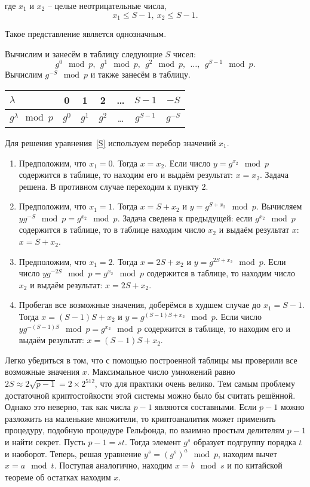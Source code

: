 где $x_{1}$ и $x_{2}$ -- целые неотрицательные числа,
    \[ x_{1} \leq S-1, ~ x_{2} \leq S-1. \]

Такое представление является однозначным.

Вычислим и занесём в таблицу следующие $S$ чисел:
    \[ g^{0} \mod p, ~~ g^{1} \mod p, ~~ g^{2} \mod p, ~~ \dots, ~~ g^{S-1} \mod p. \]
Вычислим $g^{-S} \mod p$ и также занесём в таблицу.

\begin{center} \begin{tabular}{|l|c|c|c|c|c|c|}
    \hline
    $\lambda $ & 0 & 1 & 2 & \dots & $S-1$ & $-S$ \\
    \hline
    $g^{\lambda} \mod p$ & $g^{0}$ & $g^{1}$ & $g^{2}$ & \dots & $g^{S-1}$ & $g^{-S}$ \\
    \hline
\end{tabular} \end{center}

Для решения уравнения~\ref{S} используем перебор значений $x_{1}$.
\begin{enumerate}
    \item Предположим, что $x_{1} = 0$. Тогда $x = x_{2}$. Если число $y = g^{x_{2}} \mod p$ содержится в таблице, то находим его и выдаём результат: $x=x_{2} $. Задача решена. В противном случае переходим к пункту 2.
    \item Предположим, что $x_{1} =1$. Тогда $x=S+x_{2} $ и $y=g^{S+x_{2}} \mod p$. Вычисляем $yg^{-S} \mod p=g^{x_{2}} \mod p$. Задача сведена к предыдущей: если $g^{x_{2} } \mod p$ содержится в таблице, то в таблице находим число $x_{2} $ и выдаём результат $x$: $x=S+x_{2} $.
    \item Предположим, что $x_{1} =2$. Тогда $x=2S+x_{2} $ и $y=g^{2S+x_{2} } \mod p$. Если число $yg^{-2S} \mod p=g^{x_{2} } \mod p$ содержится в таблице, то находим число $x_{2}$ и выдаём результат: $x = 2S + x_{2}$.
     \item Пробегая все возможные значения, доберёмся в худшем случае до $x_{1} =S-1$. Тогда $x=(S-1)S+x_{2} $ и $y = g^{(S-1)S+x_{2} } \mod p$. Если число $yg^{-(S-1)S} \mod p=g^{x_{2}} \mod p$ содержится в таблице, то находим его и выдаём результат: $x=(S-1)S+x_{2}$.
\end{enumerate}

Легко убедиться в том, что с помощью построенной таблицы мы проверили все возможные значения $x$. Максимальное число умножений равно $2S \approx 2\sqrt{p-1} =2\times 2^{512} $, что для практики очень велико. Тем самым проблему достаточной криптостойкости этой системы можно было бы считать решённой. Однако это неверно, так как числа $p-1$ являются составными. Если $p-1$ можно разложить на маленькие множители, то криптоаналитик может применить процедуру, подобную процедуре Гельфонда, по взаимно простым делителям $p-1$ и найти секрет. Пусть $p-1=st$. Тогда элемент $g^s$ образует подгруппу порядка $t$ и наоборот. Теперь, решая уравнение $y^s=(g^s)^a\mod p$, находим вычет $x=a\mod t$. Поступая аналогично, находим $x=b\mod s$ и по китайской теореме об остатках находим $x$.

